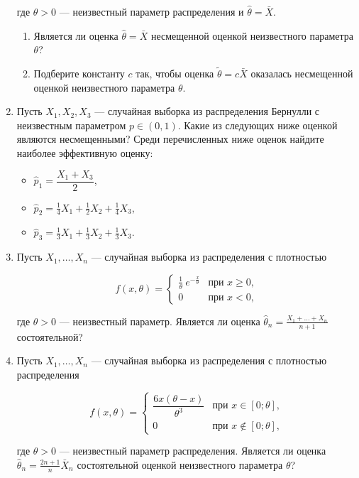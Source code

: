 \begin{enumerate}
где $\theta > 0$ — неизвестный параметр распределения и $\hat{\theta} = \bar{X}$.

\begin{enumerate}
\item Является ли оценка $\hat{\theta} = \bar{X}$ несмещенной оценкой
неизвестного параметра $\theta$?
\item Подберите константу $c$ так, чтобы оценка $\tilde{\theta} = c\bar{X}$
оказалась несмещенной оценкой неизвестного параметра $\theta$.
\end{enumerate}

\item Пусть $X_1,X_2,X_3$ — случайная выборка из распределения
Бернулли с неизвестным параметром $p \in (0,1)$.
Какие из следующих ниже оценкой являются несмещенными?
Среди перечисленных ниже оценок найдите наиболее эффективную оценку:

\begin{itemize}
  \item $\hat{p}_1 = \dfrac{X_1+X_3}{2}$,
  \item $\hat{p}_2 = \frac{1}{4}X_1+\frac{1}{2}X_2+\frac{1}{4}X_3$,
  \item $\hat{p}_3 = \frac{1}{3}X_1+\frac{1}{3}X_2+\frac{1}{3}X_3$.
\end{itemize}

\item Пусть $X_1, \ldots,X_n$ — случайная выборка из распределения с плотностью

\[
f(x,\theta) =
\begin{cases}
\frac{1}{\theta} \ e^{-\frac{x}{\theta}} & \text{при } x \geq 0, \\
0 & \text{при } x < 0,
\end{cases}
\]

где $\theta > 0$ — неизвестный параметр.
Является ли оценка  $\hat{\theta}_n = \frac{X_1+...+X_n}{n+1}$ состоятельной?

\item Пусть $X_1, \ldots ,X_n$ — случайная выборка из распределения
с плотностью распределения

\[
f(x,\theta) = \begin{cases}
\dfrac{6x(\theta-x)}{\theta^3} & \text{при } x \in [0;\theta], \\
0 & \text{при } x \not\in [0;\theta], \end{cases}
\]

где $\theta > 0$ — неизвестный параметр распределения.
Является ли оценка $\hat{\theta}_n = \frac{2n+1}{n}\bar{X}_n$ состоятельной оценкой
неизвестного параметра $\theta$?


\end{enumerate}
